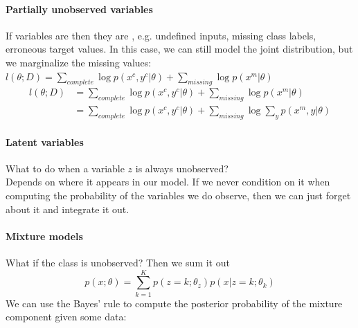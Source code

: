 \documentclass[11pt]{article}
\begin{document}
\paragraph{Partially unobserved variables}
If variables are  then they are , e.g. undefined inputs, missing class labels, erroneous target values. In this case, we can still model the joint distribution, but we marginalize the missing values:
$l(\theta; D) = \sum_{complete} \log p(x^c, y^c |\theta) + \sum_{missing} \log p(x^m|\theta)$
\begin{align*}
	l(\theta; D) &= \sum_{complete} \log p(x^c, y^c |\theta) + \sum_{missing} \log p(x^m|\theta) \\
	&= \sum_{complete} \log p(x^c,y^c|\theta) + \sum_{missing} \log \sum_{y} p(x^m, y|\theta)
\end{align*}

\paragraph{Latent variables}
What to do when a variable $z$ is always unobserved? \\
Depends on where it appears in our model. If we never condition on it when computing the probability of the variables we do observe, then we can just forget about it and integrate it out.\\
\paragraph{Mixture models}
What if the class is unobserved? Then we sum it out
$$p(x;\theta) = \sum_{k=1}^K p(z=k;\theta_z)p(x|z=k;\theta_k)$$
We can use the Bayes' rule to compute the posterior probability of the mixture component given some data:
\end{document}
